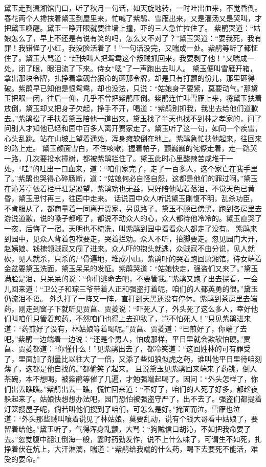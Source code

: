 \documentclass[12pt,oneside]{book}
\begin{document}
黛玉走到潇湘馆门口，听了秋月一句话，如天旋地转，一时吐出血来，不觉昏倒。春花两个人搀扶着黛玉到屋里来，忙喊了紫鹃、雪雁出来，又是灌汤又是哭叫，才把黛玉唤醒。黛玉一睁开眼就要往墙上撞，吓的三人急忙拉住了。
紫鹃哭道：“姑娘怎么了，早上不还是有说有笑的吗，怎么又不对了？”黛玉哭道：“要我死，我有罪！我错怪了小红，我没脸活着了！”一句话没完，又喘成一处。紫鹃等听了都怔住了。黛玉大骂道：“赶快叫人把鸳鸯这个叛贼抓回来，我要剥了他！”又喘成一处，闭了眼，眼泪流了下来。侍女“嗯”了一声跑出去叫人。
黛玉便叫雪雁开箱，拿出那块令牌，扎挣着拿砚台狠命的砸那令牌，却是只有打颤的份儿，那里砸得破。紫鹃早已知他是恨鸳鸯，却也没法，只说：“姑娘身子要紧，莫要动气。”那黛玉把眼一闭，往后一仰，几乎不曾把紫鹃压倒。紫鹃连忙叫雪雁上来，将黛玉扶着放倒，黛玉却又把身子欠起，挣手不开，喝道：“紫鹃别抓我，我出去给他们道歉去。”紫鹃松了手扶着黛玉陪他一道出来。黛玉找了半天也找不到林之孝家的，问了问别人才知他已经和园中百多人离开贾家走了。黛玉听了这一句，如同一个疾雷，心头乱跳。站在山坡上望着遥处，浑身瘫软倒在地上。紫鹃急忙扶他起来，往回来的路上走。
黛玉颜面雪白，不住咳嗽，握着帕子，颤巍巍的侘傺走着，走一路哭一路，几次要投水撞树，都被紫鹃拦住了。黛玉此时心里酸辣苦咸堆于一处，“哇”的吐出一口血来，道：“咱们家完了，走了一百多人，这个家亡在我手里了。”紫鹃也哭得心碎肠断，道：“姑娘何必自怪自怨，这都是他们的罪过啊。”黛玉在沁芳亭依着栏杆驻足凝望，紫鹃劝也无益，只好陪他站着落泪，不觉天色已黄昏，黛玉思忖再三，往园中走来。
话说园中众人听说黛玉刚愎不明，乱杀功臣，不肯服从了，都商量着一同离开贾家，另觅路子。黛玉不顾已傍黑，跑到各房里去游说道歉，说的嗓子都哑了，都说不动众人的心，众人都待他冷冷的。黛玉直哭了一夜，后悔了一宿。天明也不梳洗，叫紫鹃到园中看看众人都走了没有。
紫鹃来到园中，见众人背着包袱要走，哭着拦劝。众人不听，抬脚要走。忽见园门大开，赵姨娘、钱槐领贼寇又闯了进来。众人吓的抱头就逃，众贼寇不由分说，见人就砍，见人就杀，只杀的尸骨遍地，堆成小山。紫鹃吓的哭着跑回潇湘馆，侍女端着金盆要黛玉洗面，黛玉呆呆的发怔。紫鹃哭道：“姑娘快走，强盗们又来了。”黛玉满脸是泪，只呆呆的说：“你们逃命去吧，不要管我。”紫鹃又跑了出去探看，一会儿回来道：“卫公子和琮三爷带着人正和强盗打着呢，咱们的人都英勇的很。”黛玉仍流泪不语。
外头打了一阵又一阵，直打到天黑还没有停休。紫鹃到茶房里去端药，刚走到窗子下就听见贾菖、贾菱说：“吓死人了，外头死了这么多人，幸好他们叫咱们只管着煎药，不然咱们也得上去迎敌了，岂不怕死人！”只见紫鹃进来道：“药煎好了没有，林姑娘等着喝呢。”贾菖、贾菱道：“已煎好了，你端了去吧。”紫鹃一边端着一边说：“还是个男人，怕成那样，平日里就会欺软怕硬。”贾菖、贾菱都道：“你懂什么！”见紫鹃出去了，都冷笑道：“这回姓林的可有罪受了，里面加了剂量比以往大了一倍，又添了些如狼似虎之药，谁叫他平日里待咱刻薄了，这都是他自找的。”都偷笑了起来。
且说黛玉见紫鹃回来端来了药铫，倒入茶碗，本不想喝，被紫鹃等催了几遍，才勉强端起喝了。因问：“外头怎样了，你们出去瞧瞧。”紫鹃出去一瞧，慌忙回来道：“不好了，咱们的人死了好多，都趁夜躲起来了。姑娘快想想办法吧，园门恐怕被强盗守严了，出不去了。强盗们都提着灯笼搜屋子呢，倘若叫他们搜到了咱们，可怎么是好。”掩面而泣。雪雁也泣道：“外头那些贼叫嚷着说见了林姑娘，莫要乱动，说有个钱大哥看中姑娘了，要留着给他。”黛玉听了，气得浑身乱颤，大骂：“狗贼信口胡沁，不如把我命要了去。”忽觉腹中翻江倒海一般，霎时药劲发作，说不上什么味了，可谓生不如死，扎挣着伏在炕上，大汗淋漓，喘道：“紫鹃给我端的什么药，喝下去要死不能活，难受的要命。”
\end{document}
